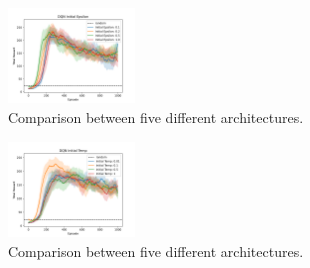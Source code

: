 \documentclass{article}
\begin{document}
   \begin{figure}[ht!]
      \centering
      \includegraphics[width=0.3\textwidth]{assets/fig_hp/epsilon.initial.png}
      \caption{Comparison between five different architectures.
      }
      \label{fig:comp_epsilon}
   \end{figure}

   \begin{figure}[ht!]
      \centering
      \includegraphics[width=0.3\textwidth]{assets/fig_hp/temp.initial.png}
      \caption{Comparison between five different architectures.
      }
      \label{fig:comp_temp}
   \end{figure}


\end{document}
